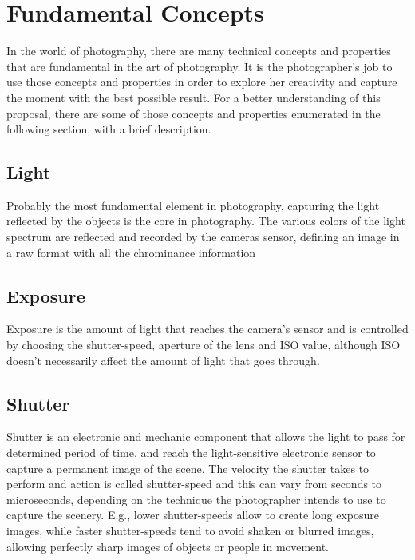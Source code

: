 \chapter{Fundamental Concepts}
In the world of photography, there are many technical concepts and properties that are fundamental in the art of photography. It is the photographer's job to use those concepts and properties in order to explore her creativity and capture the moment with the best possible result.
For a better understanding of this proposal, there are some of those concepts and properties enumerated in the following section, with a brief description.

\section{Light}

Probably the most fundamental element in photography, capturing the light reflected by the objects is the core in photography. The various colors of the light spectrum are reflected and recorded by the cameras sensor, defining an image in a raw format with all the chrominance information

\section{Exposure}

Exposure is the amount of light that reaches the camera’s sensor and is controlled by choosing the shutter-speed, aperture of the lens and ISO value, although ISO doesn’t necessarily affect the amount of light that goes through.

\section{Shutter}

Shutter is an electronic and mechanic component that allows the light to pass for determined period of time, and reach the light-sensitive electronic sensor to capture a permanent image of the scene. The velocity the shutter takes to perform and action is called shutter-speed and this can vary from seconds to microseconds, depending on the technique the photographer intends to use to capture the scenery. E.g., lower shutter-speeds allow to create long exposure images, while faster shutter-speeds tend to avoid shaken or blurred images, allowing perfectly sharp images of objects or people in movement.

